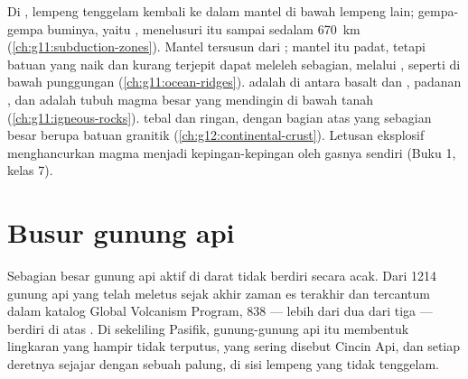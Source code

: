 \begin{recall}
Di , lempeng  tenggelam kembali ke dalam mantel di
bawah lempeng lain; gempa-gempa buminya, yaitu , menelusuri
 itu sampai sedalam \qty{670}{km} (\cref{ch:g11:subduction-zones}).
Mantel tersusun dari ; mantel itu padat, tetapi batuan yang naik dan
kurang terjepit dapat meleleh sebagian, melalui , seperti di
bawah punggungan (\cref{ch:g11:ocean-ridges}).  adalah 
di antara basalt dan ,  padanan , dan  adalah tubuh
magma besar yang mendingin di bawah tanah (\cref{ch:g11:igneous-rocks}).  tebal dan ringan, dengan bagian atas yang sebagian besar berupa batuan
granitik (\cref{ch:g12:continental-crust}). Letusan eksplosif menghancurkan
magma menjadi kepingan-kepingan oleh gasnya sendiri (Buku 1, kelas 7).
\end{recall}

\section{Busur gunung api}

Sebagian besar gunung api aktif di darat tidak berdiri secara acak. Dari 1214
gunung api yang telah meletus sejak akhir zaman es terakhir dan tercantum dalam
katalog Global Volcanism Program, 838 --- lebih dari dua dari tiga --- berdiri di
atas . Di sekeliling Pasifik, gunung-gunung api itu membentuk
lingkaran yang hampir tidak terputus, yang sering disebut Cincin Api, dan setiap
deretnya sejajar dengan sebuah palung, di sisi lempeng yang tidak tenggelam.

